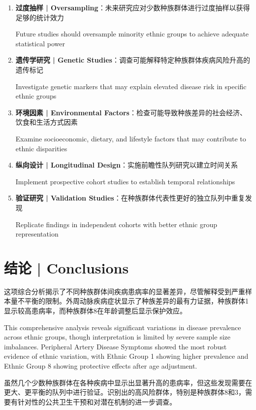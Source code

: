 \documentclass[12pt,a4paper]{article}
\begin{document}
\begin{enumerate}
    \item \textbf{过度抽样 | Oversampling}：未来研究应对少数种族群体进行过度抽样以获得足够的统计效力
    
    Future studies should oversample minority ethnic groups to achieve adequate statistical power
    
    \item \textbf{遗传学研究 | Genetic Studies}：调查可能解释特定种族群体疾病风险升高的遗传标记
    
    Investigate genetic markers that may explain elevated disease risk in specific ethnic groups
    
    \item \textbf{环境因素 | Environmental Factors}：检查可能导致种族差异的社会经济、饮食和生活方式因素
    
    Examine socioeconomic, dietary, and lifestyle factors that may contribute to ethnic disparities
    
    \item \textbf{纵向设计 | Longitudinal Design}：实施前瞻性队列研究以建立时间关系
    
    Implement prospective cohort studies to establish temporal relationships
    
    \item \textbf{验证研究 | Validation Studies}：在种族群体代表性更好的独立队列中重复发现
    
    Replicate findings in independent cohorts with better ethnic group representation
\end{enumerate}

\section{结论 | Conclusions}

这项综合分析揭示了不同种族群体间疾病患病率的显著差异，尽管解释受到严重样本量不平衡的限制。外周动脉疾病症状显示了种族差异的最有力证据，种族群体1显示较高患病率，而种族群体8在年龄调整后显示保护效应。

This comprehensive analysis reveals significant variations in disease prevalence across ethnic groups, though interpretation is limited by severe sample size imbalances. Peripheral Artery Disease Symptoms showed the most robust evidence of ethnic variation, with Ethnic Group 1 showing higher prevalence and Ethnic Group 8 showing protective effects after age adjustment.

虽然几个少数种族群体在各种疾病中显示出显著升高的患病率，但这些发现需要在更大、更平衡的队列中进行验证。识别出的高风险群体，特别是种族群体8和3，需要有针对性的公共卫生干预和对潜在机制的进一步调查。
\end{document}
